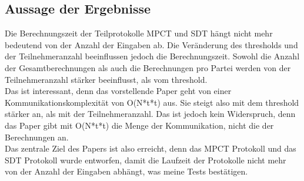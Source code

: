 \subsection{Aussage der Ergebnisse}
Die Berechnungszeit der Teilprotokolle MPCT und SDT hängt nicht mehr bedeutend von der Anzahl der Eingaben ab. Die Veränderung des thresholds und der Teilnehmeranzahl beeinflussen jedoch die Berechnungszeit. Sowohl die Anzahl der Gesamtberechnungen als auch die Berechnungen pro Partei werden von der Teilnehmeranzahl stärker beeinflusst, als vom threshold.\\
Das ist interessant, denn das vorstellende Paper \cite{Doettling2021} geht von einer Kommunikationskomplexität von O(N*t*t) aus. Sie steigt also mit dem threshold stärker an, als mit der Teilnehmeranzahl. Das ist jedoch kein Widerspruch, denn das Paper gibt mit O(N*t*t) die Menge der Kommunikation, nicht die der Berechnungen an.\\
Das zentrale Ziel des Papers \cite{Doettling2021} ist also erreicht, denn das MPCT Protokoll und das SDT Protokoll wurde entworfen, damit die Laufzeit der Protokolle nicht mehr von der Anzahl der Eingaben abhängt, was meine Tests bestätigen.